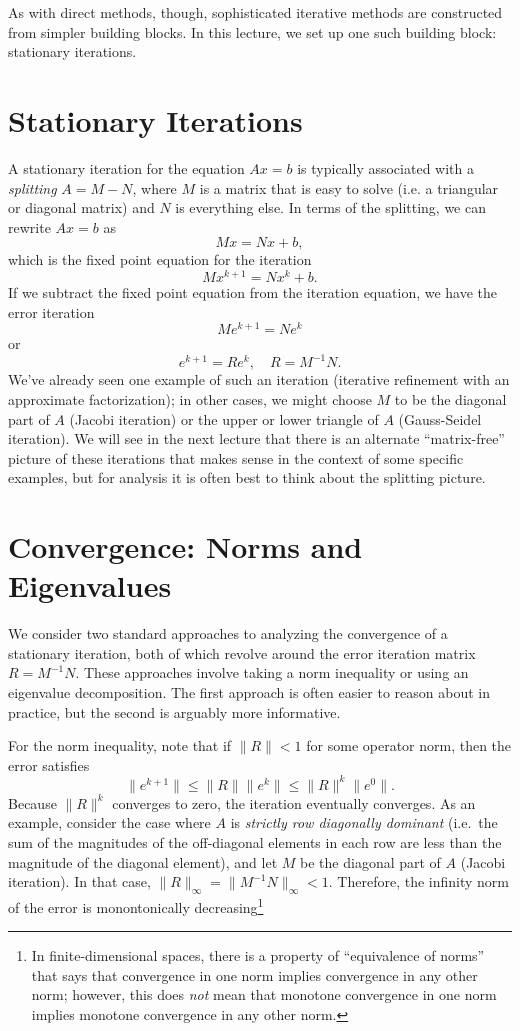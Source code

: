 \documentclass[12pt, leqno]{article}
\begin{document}
As with direct methods, though, sophisticated iterative methods are
constructed from simpler building blocks.  In this lecture, we set up
one such building block: stationary iterations.

\section*{Stationary Iterations}

A stationary iteration for the equation $Ax = b$ is typically
associated with a {\em splitting} $A = M-N$, where $M$ is a matrix
that is easy to solve (i.e. a triangular or diagonal matrix) and $N$
is everything else.  In terms of the splitting, we can rewrite
$Ax = b$ as
\[
  Mx = Nx + b,
\]
which is the fixed point equation for the iteration
\[
  Mx^{k+1} = Nx^{k} + b.
\]
If we subtract the fixed point equation from the iteration equation,
we have the error iteration
\[
  M e^{k+1} = N e^k
\]
or
\[
  e^{k+1} = R e^k, \quad R = M^{-1} N.
\]
We've already seen one example of such an iteration (iterative
refinement with an approximate factorization); in other cases,
we might choose $M$ to be the diagonal part of $A$ (Jacobi iteration)
or the upper or lower triangle of $A$ (Gauss-Seidel iteration).
We will see in the next lecture that there is an alternate
``matrix-free'' picture of these iterations that makes sense in the
context of some specific examples, but for analysis it is often best
to think about the splitting picture.

\section*{Convergence: Norms and Eigenvalues}

We consider two standard approaches to analyzing the convergence of a
stationary iteration, both of which revolve around the error iteration
matrix $R = M^{-1} N$.  These approaches involve taking a norm
inequality or using an eigenvalue decomposition.  The first approach
is often easier to reason about in practice, but the second is
arguably more informative.

For the norm inequality, note that if $\|R\| < 1$ for some operator
norm, then the error satisfies
\[
  \|e^{k+1}\| \leq \|R\| \|e^k\| \leq \|R\|^k \|e^0\|.
\]
Because $\|R\|^k$ converges to zero, the iteration eventually
converges.  As an example, consider the case where $A$ is
{\em strictly row diagonally dominant} (i.e.~the sum of the
magnitudes of the off-diagonal elements in each row are less
than the magnitude of the diagonal element), and let $M$ be the diagonal
part of $A$ (Jacobi iteration).  In that case,
$\|R\|_\infty = \|M^{-1} N\|_\infty < 1$.  Therefore, the infinity
norm of the error is monontonically decreasing\footnote{%
  In finite-dimensional spaces, there is a property of ``equivalence
  of norms'' that says that convergence in one norm implies
  convergence in any other norm; however, this does {\em not} mean
  that monotone convergence in one norm implies monotone convergence
  in any other norm.}
\end{document}
